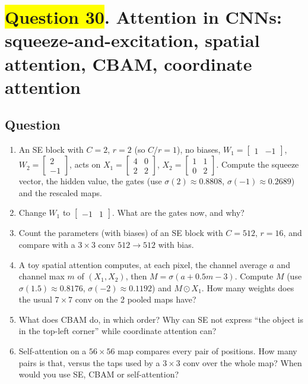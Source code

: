 \documentclass[12pt,a4paper]{article}
\newcommand{\hlq}[1]{{\setlength{\fboxsep}{1.5pt}\colorbox{yellow}{#1}}}
\begin{document}
\section[Question 30. Attention in CNNs: squeeze-and-excitation, spatial attention, CBAM, coordinate attention]{\hlq{Question 30}. Attention in CNNs: squeeze-and-excitation, spatial attention, CBAM, coordinate attention}
\subsection*{Question}
\begin{enumerate}[label=(\alph*)]
\item[\hlq{(a)}] An SE block with $C=2$, $r=2$ (so $C/r=1$), no biases, $W_1=\begin{bmatrix}1&-1\end{bmatrix}$, $W_2=\begin{bmatrix}2\\-1\end{bmatrix}$, acts on $X_1=\begin{bmatrix}4&0\\2&2\end{bmatrix}$, $X_2=\begin{bmatrix}1&1\\0&2\end{bmatrix}$. Compute the squeeze vector, the hidden value, the gates (use $\sigma(2)\approx0.8808$, $\sigma(-1)\approx0.2689$) and the rescaled maps.
\item[(b)] Change $W_1$ to $\begin{bmatrix}-1&1\end{bmatrix}$. What are the gates now, and why?
\item[\hlq{(c)}] Count the parameters (with biases) of an SE block with $C=512$, $r=16$, and compare with a $3\times3$ conv $512\to512$ with bias.
\item[\hlq{(d)}] A toy spatial attention computes, at each pixel, the channel average $a$ and channel max $m$ of $(X_1,X_2)$, then $M=\sigma(a+0.5m-3)$. Compute $M$ (use $\sigma(1.5)\approx0.8176$, $\sigma(-2)\approx0.1192$) and $M\odot X_1$. How many weights does the usual $7\times7$ conv on the 2 pooled maps have?
\item[\hlq{(e)}] What does CBAM do, in which order? Why can SE not express ``the object is in the top-left corner'' while coordinate attention can?
\item[\hlq{(f)}] Self-attention on a $56\times56$ map compares every pair of positions. How many pairs is that, versus the taps used by a $3\times3$ conv over the whole map? When would you use SE, CBAM or self-attention?
\end{enumerate}
\end{document}
